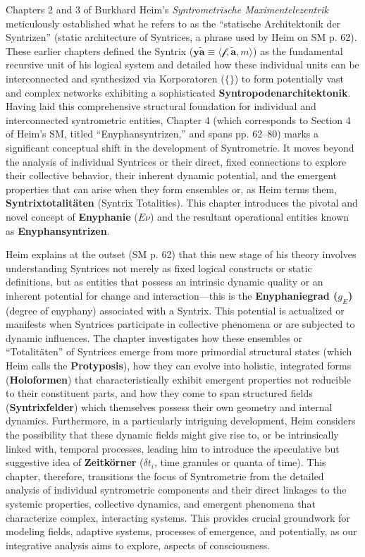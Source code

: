 \documentclass[12pt]{article}
\newcommand{\q}[1]{\enquote{#1}}
\newcommand{\syntrix}{\bm{y\widetilde{a}}}
\newcommand{\metrophor}{\bm{\widetilde{a}}}
\newcommand{\synkolator}{\mathcal{f}}
\newcommand{\synkolationsstufe}{m}
\newcommand{\enyphaniegrad}{g_E}
\newcommand{\zeitkorn}{\delta t_i}
\begin{document}
Chapters 2 and 3 of Burkhard Heim's \textit{Syntrometrische Maximentelezentrik} meticulously established what he refers to as the \q{statische Architektonik der Syntrizen} (static architecture of Syntrices, a phrase used by Heim on SM p. 62). These earlier chapters defined the Syntrix (\( \syntrix \equiv \langle \synkolator, \metrophor, \synkolationsstufe \rangle \)) as the fundamental recursive unit of his logical system and detailed how these individual units can be interconnected and synthesized via Korporatoren (\( \{ \} \)) to form potentially vast and complex networks exhibiting a sophisticated \textbf{Syntropodenarchitektonik}. Having laid this comprehensive structural foundation for individual and interconnected syntrometric entities, Chapter 4 (which corresponds to Section 4 of Heim's SM, titled \q{Enyphansyntrizen,} and spans pp. 62–80) marks a significant conceptual shift in the development of Syntrometrie. It moves beyond the analysis of individual Syntrices or their direct, fixed connections to explore their collective behavior, their inherent dynamic potential, and the emergent properties that can arise when they form ensembles or, as Heim terms them, \textbf{Syntrixtotalitäten} (Syntrix Totalities). This chapter introduces the pivotal and novel concept of \textbf{Enyphanie} (\(E\nu\)) and the resultant operational entities known as \textbf{Enyphansyntrizen}.

Heim explains at the outset (SM p. 62) that this new stage of his theory involves understanding Syntrices not merely as fixed logical constructs or static definitions, but as entities that possess an intrinsic dynamic quality or an inherent potential for change and interaction—this is the \textbf{Enyphaniegrad (\(\enyphaniegrad\))} (degree of enyphany) associated with a Syntrix. This potential is actualized or manifests when Syntrices participate in collective phenomena or are subjected to dynamic influences. The chapter investigates how these ensembles or \q{Totalitäten} of Syntrices emerge from more primordial structural states (which Heim calls the \textbf{Protyposis}), how they can evolve into holistic, integrated forms (\textbf{Holoformen}) that characteristically exhibit emergent properties not reducible to their constituent parts, and how they come to span structured fields (\textbf{Syntrixfelder}) which themselves possess their own geometry and internal dynamics. Furthermore, in a particularly intriguing development, Heim considers the possibility that these dynamic fields might give rise to, or be intrinsically linked with, temporal processes, leading him to introduce the speculative but suggestive idea of \textbf{Zeitkörner} (\(\zeitkorn\), time granules or quanta of time). This chapter, therefore, transitions the focus of Syntrometrie from the detailed analysis of individual syntrometric components and their direct linkages to the systemic properties, collective dynamics, and emergent phenomena that characterize complex, interacting systems. This provides crucial groundwork for modeling fields, adaptive systems, processes of emergence, and potentially, as our integrative analysis aims to explore, aspects of consciousness.
\end{document}
